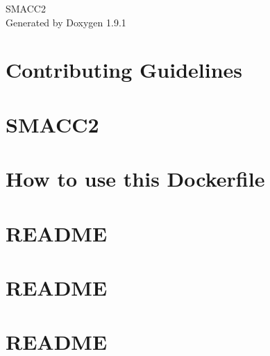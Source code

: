 \let\mypdfximage\pdfximage\def\pdfximage{\immediate\mypdfximage}\documentclass[twoside]{book}
\newcommand{\+}{\discretionary{\mbox{\scriptsize$\hookleftarrow$}}{}{}}
\newcommand{\clearemptydoublepage}{%
  \newpage{\pagestyle{empty}\cleardoublepage}%
}
\begin{document}
\raggedbottom

\hypersetup{pageanchor=false,
             bookmarksnumbered=true,
             pdfencoding=unicode
            }
\begin{titlepage}
\vspace*{7cm}
\begin{center}%
{\Large SMACC2 }\\
\vspace*{1cm}
{\large Generated by Doxygen 1.9.1}\\
\end{center}
\end{titlepage}
\clearemptydoublepage
{}
\tableofcontents
\clearemptydoublepage
{}
\hypersetup{pageanchor=true}

\chapter{Contributing Guidelines}
\label{md_CONTRIBUTING}

\chapter{SMACC2}
\label{md_README}

\chapter{How to use this Dockerfile}
\label{md_smacc2_ci_docker_ros_rollingAndGalactic_ubuntu_20_04_README}

\chapter{README}
\label{md_smacc_sm_reference_library_sm_atomic_README}

\chapter{README}
\label{md_smacc_sm_reference_library_sm_atomic_performance_test_README}

\chapter{README}
\label{md_smacc_sm_reference_library_sm_atomic_subscribers_performance_test_README}

\end{document}
